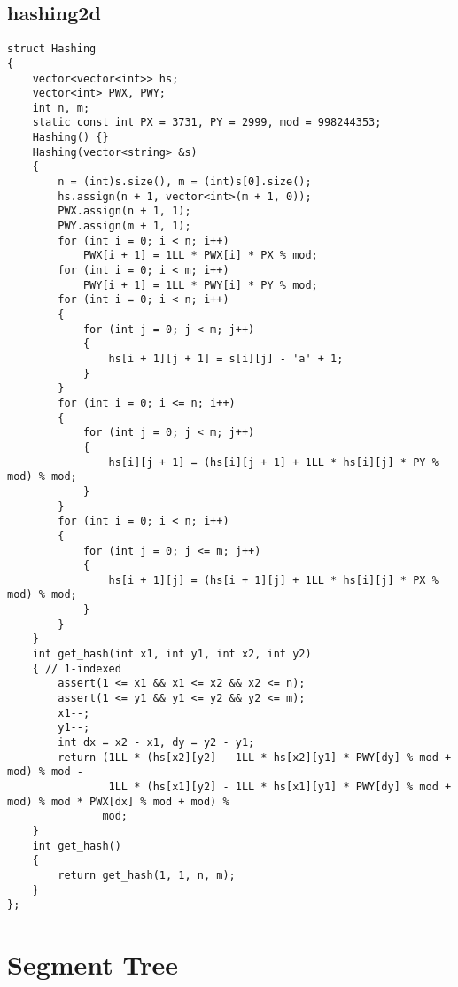 \subsection*{hashing2d}
\begin{lstlisting}
struct Hashing
{
    vector<vector<int>> hs;
    vector<int> PWX, PWY;
    int n, m;
    static const int PX = 3731, PY = 2999, mod = 998244353;
    Hashing() {}
    Hashing(vector<string> &s)
    {
        n = (int)s.size(), m = (int)s[0].size();
        hs.assign(n + 1, vector<int>(m + 1, 0));
        PWX.assign(n + 1, 1);
        PWY.assign(m + 1, 1);
        for (int i = 0; i < n; i++)
            PWX[i + 1] = 1LL * PWX[i] * PX % mod;
        for (int i = 0; i < m; i++)
            PWY[i + 1] = 1LL * PWY[i] * PY % mod;
        for (int i = 0; i < n; i++)
        {
            for (int j = 0; j < m; j++)
            {
                hs[i + 1][j + 1] = s[i][j] - 'a' + 1;
            }
        }
        for (int i = 0; i <= n; i++)
        {
            for (int j = 0; j < m; j++)
            {
                hs[i][j + 1] = (hs[i][j + 1] + 1LL * hs[i][j] * PY % mod) % mod;
            }
        }
        for (int i = 0; i < n; i++)
        {
            for (int j = 0; j <= m; j++)
            {
                hs[i + 1][j] = (hs[i + 1][j] + 1LL * hs[i][j] * PX % mod) % mod;
            }
        }
    }
    int get_hash(int x1, int y1, int x2, int y2)
    { // 1-indexed
        assert(1 <= x1 && x1 <= x2 && x2 <= n);
        assert(1 <= y1 && y1 <= y2 && y2 <= m);
        x1--;
        y1--;
        int dx = x2 - x1, dy = y2 - y1;
        return (1LL * (hs[x2][y2] - 1LL * hs[x2][y1] * PWY[dy] % mod + mod) % mod -
                1LL * (hs[x1][y2] - 1LL * hs[x1][y1] * PWY[dy] % mod + mod) % mod * PWX[dx] % mod + mod) %
               mod;
    }
    int get_hash()
    {
        return get_hash(1, 1, n, m);
    }
};
\end{lstlisting}

\section*{Segment Tree}

